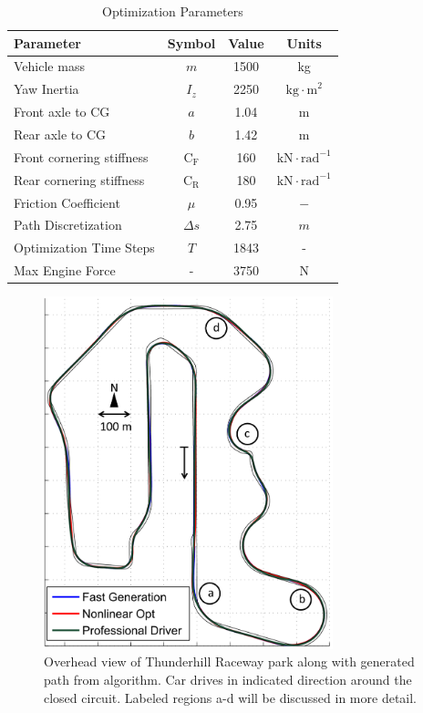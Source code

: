 \documentclass[twocolumn,10pt, final]{asme2e}
\begin{document}
\begin{table}[h]
\footnotesize
\begin{center}
\caption{Optimization Parameters}\label{tb:params}
\begin{tabular}{lccc}
Parameter & Symbol & Value & Units \\\hline
Vehicle mass & $m$ & 1500 & kg \\
Yaw Inertia & $I_z$ & 2250 & $\mathrm{kg \cdot m}^2$\\
Front axle to CG & $a$ & 1.04 & m\\
Rear axle to CG & $b$ & 1.42 & m\\
Front cornering stiffness & $\mathrm{C}_\mathrm{F}$ & 160 & $\mathrm{kN \cdot rad}^{-1}$ \\
Rear cornering stiffness & $\mathrm{C}_\mathrm{R}$ & 180 & $\mathrm{kN \cdot rad}^{-1}$ \\
Friction Coefficient     & $\mu $                  &  0.95 & $\mathrm{-} $ \\
Path Discretization      & $\Delta s$              & 2.75 & $m$\\
Optimization Time Steps  & $T       $              & 1843 & -  \\
Max Engine Force         & -                       & 3750 & N\\\hline
\end{tabular}
\end{center}
\end{table}

\begin{figure}
\centering
\includegraphics[width=3.3in]{figures/racinglines.png}
\caption{Overhead view of Thunderhill Raceway park along with generated path from algorithm. Car drives in indicated direction around the closed circuit. Labeled regions a-d will be discussed in more detail.}
\label{racingLines}
\end{figure}
\end{document}
